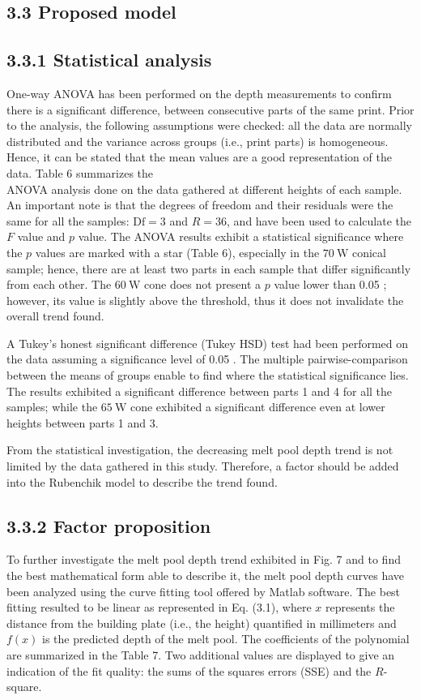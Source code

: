 \documentclass[10pt]{article}
\begin{document}
\subsection*{3.3 Proposed model}
\subsection*{3.3.1 Statistical analysis}
One-way ANOVA has been performed on the depth measurements to confirm there is a significant difference, between consecutive parts of the same print. Prior to the analysis, the following assumptions were checked: all the data are normally distributed and the variance across groups (i.e., print parts) is homogeneous. Hence, it can be stated that the mean values are a good representation of the data. Table 6 summarizes the\\
ANOVA analysis done on the data gathered at different heights of each sample. An important note is that the degrees of freedom and their residuals were the same for all the samples: $\mathrm{Df}=3$ and $R=36$, and have been used to calculate the $F$ value and $p$ value. The ANOVA results exhibit a statistical significance where the $p$ values are marked with a star (Table 6), especially in the $70 \mathrm{~W}$ conical sample; hence, there are at least two parts in each sample that differ significantly from each other. The $60 \mathrm{~W}$ cone does not present a $p$ value lower than 0.05 ; however, its value is slightly above the threshold, thus it does not invalidate the overall trend found.

A Tukey's honest significant difference (Tukey HSD) test had been performed on the data assuming a significance level of 0.05 . The multiple pairwise-comparison between the means of groups enable to find where the statistical significance lies. The results exhibited a significant difference between parts 1 and 4 for all the samples; while the $65 \mathrm{~W}$ cone exhibited a significant difference even at lower heights between parts 1 and 3.

From the statistical investigation, the decreasing melt pool depth trend is not limited by the data gathered in this study. Therefore, a factor should be added into the Rubenchik model to describe the trend found.

\subsection*{3.3.2 Factor proposition}
To further investigate the melt pool depth trend exhibited in Fig. 7 and to find the best mathematical form able to describe it, the melt pool depth curves have been analyzed using the curve fitting tool offered by Matlab software. The best fitting resulted to be linear as represented in Eq. (3.1), where $x$ represents the distance from the building plate (i.e., the height) quantified in millimeters and $f(x)$ is the predicted depth of the melt pool. The coefficients of the polynomial are summarized in the Table 7. Two additional values are displayed to give an indication of the fit quality: the sums of the squares errors (SSE) and the $R$-square.
\end{document}
